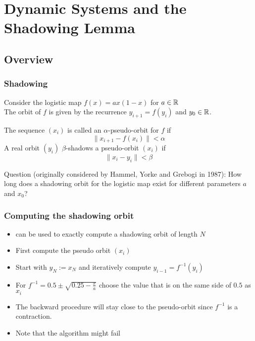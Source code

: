\section{Dynamic Systems and the Shadowing Lemma}
\subsection{Overview}
\begin{frame}[<+->]
\frametitle{Shadowing}
Consider the logistic map $f(x) = a x  (1-x)$ for $a \in \mathbb{R}$ \\
The orbit of $f$ is given by the recurrence 
$y_{i+1} = f(y_i)$ and $y_0 \in \mathbb{R}$.
\pause
\begin{definition}
	The sequence $(x_i)$ is called an $\alpha$-pseudo-orbit for $f$ if 
	$$
	\| x_{i+1} - f(x_i) \| < \alpha
	$$ 
	A real orbit $(y_i)$ $\beta$-shadows a pseudo-orbit $(x_i)$ if 
	$$
	\| x_{i} - y_i \| < \beta
	$$ 
\end{definition}
\pause
Question (originally considered by Hammel, Yorke and Grebogi in 1987): How long does a shadowing orbit for the logistic map exist for different parameters $a$ and $x_0$?
\end{frame}
\begin{frame}[<+->]
\frametitle{Computing the shadowing orbit}
\begin{itemize}
\item \irram can be used to exactly compute a shadowing orbit of length $N$
\item First compute the pseudo orbit $(x_i)$
\item Start with $y_N := x_N$ and iteratively compute $y_{i-1} = f^{-1}(y_i)$
\item For $f^{-1} = 0.5 \pm \sqrt{0.25-\frac{x}{a}}$ choose the value that is on the same side of $0.5$ as $x_i$
\item The backward procedure will stay close to the pseudo-orbit since $f^{-1}$ is a contraction.
\item Note that the algorithm might fail
\end{itemize}
\end{frame}